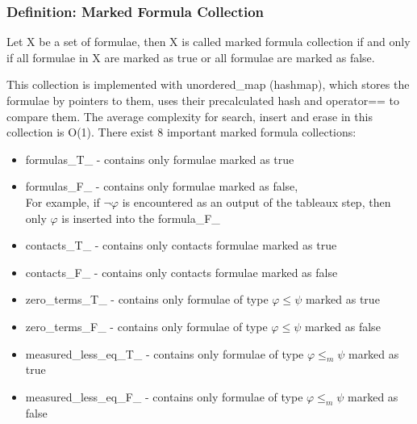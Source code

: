 \documentclass{article}
\begin{document}
		\subsubsection*{Definition: Marked Formula Collection}
			Let X be a set of formulae, then X is called marked formula collection if and only if all formulae in X are marked as true 
			or all formulae are marked as false.

			This collection is implemented with unordered\_map (hashmap),
			which stores the formulae by pointers to them, uses their precalculated hash and operator== to compare them.
			The average complexity for search, insert and erase in this collection is O(1).
		\newline
		\newline
		There exist 8 important marked formula collections:
		\begin{itemize}
			\item formulas\_T\_ - contains only formulae marked as true
			\item formulas\_F\_ - contains only formulae marked as false, \\
				For example, if $\neg\varphi$ is encountered as an output of the tableaux step, then only $\varphi$ is inserted into the formula\_F\_
			\item contacts\_T\_ - contains only contacts formulae marked as true
			\item contacts\_F\_ - contains only contacts formulae marked as false
			\item zero\_terms\_T\_ - contains only formulae of type $\varphi \le \psi$ marked as true
			\item zero\_terms\_F\_ - contains only formulae of type $\varphi \le \psi$ marked as false
			\item measured\_less\_eq\_T\_ - contains only formulae of type $\varphi \le_m \psi$ marked as true
			\item measured\_less\_eq\_F\_ - contains only formulae of type $\varphi \le_m \psi$ marked as false
		\end{itemize}
\end{document}
